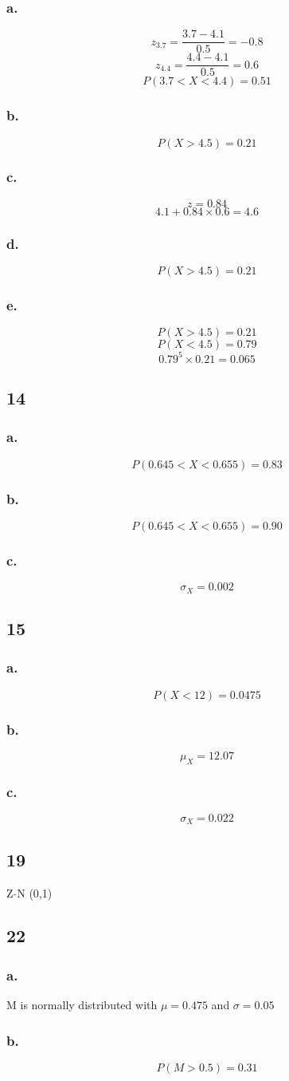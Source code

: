 \documentclass[11pt]{article}
\begin{document}
\subsubsection*{a.}
\[ z_{3.7} = \frac{3.7 - 4.1}{0.5} = -0.8 \]
\[ z_{4.4} = \frac{4.4 - 4.1}{0.5} = 0.6 \]
\[ P(3.7 < X < 4.4) = 0.51 \]
\subsubsection*{b.}
\[ P(X > 4.5) = 0.21 \]
\subsubsection*{c.}
\[ z = 0.84 \]
\[ 4.1 + 0.84 \times 0.6 = 4.6 \]
\subsubsection*{d.}
\[ P(X > 4.5) = 0.21 \]
\subsubsection*{e.}
\[ P(X > 4.5) = 0.21 \]
\[ P(X < 4.5) = 0.79 \]
\[ 0.79^5 \times 0.21 = 0.065 \]
\subsection*{14}
\subsubsection*{a.}
\[ P(0.645 < X < 0.655) = 0.83 \]
\subsubsection*{b.}
\[ P(0.645 < X < 0.655) = 0.90 \]
\subsubsection*{c.}
\[ \sigma_X = 0.002 \]
\subsection*{15}
\subsubsection*{a.}
\[ P(X<12) = 0.0475 \]
\subsubsection*{b.}
\[ \mu_X = 12.07 \]
\subsubsection*{c.}
\[ \sigma_X = 0.022 \]
\subsection*{19}
Z $\tilde{}$N (0,1)
\subsection*{22}
\subsubsection*{a.}
M is normally distributed with $\mu = 0.475$ and $\sigma = 0.05$
\subsubsection*{b.}
\[ P(M>0.5) = 0.31 \]
\end{document}

